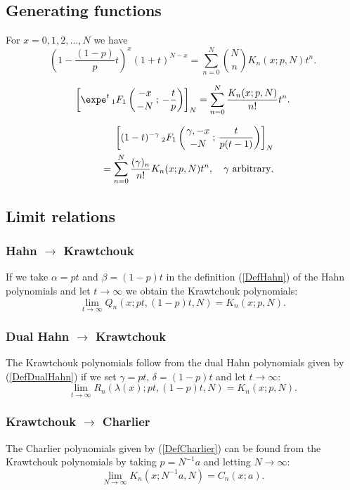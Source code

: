 \documentclass[envcountchap,graybox]{svmono}
\newcounter{rom}
\newcommand{\hyp}[5]{\mbox{}_{#1}{F}_{#2}
\left(\genfrac{}{}{0pt}{}{#3}{#4}\,;\,#5\right)}
\begin{document}
\subsection*{Generating functions}
For $x=0,1,2,\ldots,N$ we have
\begin{equation}
\label{GenKrawtchouk1}
\left(1-\frac{(1-p)}{p}t\right)^x(1+t)^{N-x}=
\sum_{n=0}^N\binom{N}{n}K_n(x;p,N)t^n.
\end{equation}

\begin{equation}
\label{GenKrawtchouk2}
\left[\expe^t\,\hyp{1}{1}{-x}{-N}{-\frac{t}{p}}\right]_N=
\sum_{n=0}^N\frac{K_n(x;p,N)}{n!}t^n.
\end{equation}

\begin{eqnarray}
\label{GenKrawtchouk3}
& &\left[(1-t)^{-\gamma}\,\hyp{2}{1}{\gamma,-x}{-N}{\frac{t}{p(t-1)}}\right]_N\nonumber\\
& &{}=\sum_{n=0}^N\frac{(\gamma)_n}{n!}K_n(x;p,N)t^n,
\quad\textrm{$\gamma$ arbitrary}.
\end{eqnarray}

\subsection*{Limit relations}

\subsubsection*{Hahn $\rightarrow$ Krawtchouk}
If we take $\alpha=pt$ and $\beta=(1-p)t$ in the definition (\ref{DefHahn}) of the Hahn
polynomials and let $t\rightarrow\infty$ we obtain the Krawtchouk polynomials:
$$\lim_{t\rightarrow\infty}Q_n(x;pt,(1-p)t,N)=K_n(x;p,N).$$

\subsubsection*{Dual Hahn $\rightarrow$ Krawtchouk}
The Krawtchouk polynomials follow from the dual Hahn polynomials given by
(\ref{DefDualHahn}) if we set $\gamma=pt$, $\delta=(1-p)t$ and let $t\rightarrow\infty$:
$$\lim_{t\rightarrow\infty}R_n(\lambda(x);pt,(1-p)t,N)=K_n(x;p,N).$$

\subsubsection*{Krawtchouk $\rightarrow$ Charlier}
The Charlier polynomials given by (\ref{DefCharlier}) can be found from the Krawtchouk
polynomials by taking $p=N^{-1}a$ and letting $N\rightarrow\infty$:
\begin{equation}
\lim_{N\rightarrow\infty}K_n(x;N^{-1}a,N)=C_n(x;a).
\end{equation}
\end{document}
